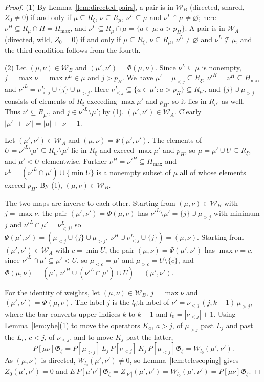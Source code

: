 \documentclass[11pt]{article}
\newcommand{\G}{\mathfrak{G}}
\begin{document}
\begin{proof}
(1) By Lemma~\ref{lem:directed-pairs}, a pair is in $\mathcal W_B$
(directed, shared, $Z_0\neq0$) if and only if $\mu\subseteq R_\xi$,
$\nu\subseteq R_\mu$, $\nu^L\subseteq\mu$ and $\nu^L\cap\mu\neq\varnothing$;
here $\nu^H\subseteq R_\mu\cap H=H_{\max}$, and
$\nu^L\subseteq R_\mu\cap\mu=\{a\in\mu:a>p_H\}$. A pair is in
$\mathcal W_A$ (directed, wild, $Z_0=0$) if and only if
$\mu\subseteq R_\xi$, $\nu\subseteq R_\mu$, $\nu^L\neq\varnothing$ and
$\nu^L\not\subseteq\mu$, and the third condition follows from the
fourth.

(2) Let $(\mu,\nu)\in\mathcal W_B$ and $(\mu',\nu')=\Phi(\mu,\nu)$.
Since $\nu^L\subseteq\mu$ is nonempty, $j=\max\nu=\max\nu^L\in\mu$ and
$j>p_H$. We have $\mu'=\mu_{<j}\subseteq R_\xi$, $\nu'^H=\nu^H\subseteq H_{\max}$
and $\nu'^L=\nu^L_{<j}\cup\{j\}\cup\mu_{>j}$. Here
$\nu^L_{<j}\subseteq\{a\in\mu':a>p_H\}\subseteq R_{\mu'}$, and
$\{j\}\cup\mu_{>j}$ consists of elements of $R_\xi$ exceeding
$\max\mu'$ and $p_H$, so it lies in $R_{\mu'}$ as well. Thus
$\nu'\subseteq R_{\mu'}$, and $j\in\nu'^L\setminus\mu'$; by (1),
$(\mu',\nu')\in\mathcal W_A$. Clearly $|\mu'|+|\nu'|=|\mu|+|\nu|-1$.

Let $(\mu',\nu')\in\mathcal W_A$ and $(\mu,\nu)=\Psi(\mu',\nu')$. The
elements of $U=\nu'^L\setminus\mu'\subseteq R_{\mu'}\setminus\mu'$ lie
in $R_\xi$ and exceed $\max\mu'$ and $p_H$, so $\mu=\mu'\cup U\subseteq R_\xi$,
and $\mu'<U$ elementwise. Further $\nu^H=\nu'^H\subseteq H_{\max}$ and
$\nu^L=(\nu'^L\cap\mu')\cup\{\min U\}$ is a nonempty subset of $\mu$
all of whose elements exceed $p_H$. By (1), $(\mu,\nu)\in\mathcal W_B$.

The two maps are inverse to each other. Starting from
$(\mu,\nu)\in\mathcal W_B$ with $j=\max\nu$, the pair
$(\mu',\nu')=\Phi(\mu,\nu)$ has $\nu'^L\setminus\mu'=\{j\}\cup\mu_{>j}$
with minimum $j$ and $\nu'^L\cap\mu'=\nu^L_{<j}$, so
$\Psi(\mu',\nu')=(\mu_{<j}\cup\{j\}\cup\mu_{>j},\ \nu^H\cup\nu^L_{<j}\cup\{j\})=(\mu,\nu)$.
Starting from $(\mu',\nu')\in\mathcal W_A$ with $c=\min U$, the pair
$(\mu,\nu)=\Psi(\mu',\nu')$ has $\max\nu=c$, since $\nu'^L\cap\mu'\subseteq\mu'<U$,
so $\mu_{<c}=\mu'$ and $\mu_{>c}=U\setminus\{c\}$, and
$\Phi(\mu,\nu)=(\mu',\ \nu'^H\cup(\nu'^L\cap\mu')\cup U)=(\mu',\nu')$.

For the identity of weights, let $(\mu,\nu)\in\mathcal W_B$,
$j=\max\nu$ and $(\mu',\nu')=\Phi(\mu,\nu)$. The label $j$ is the
$l_0$th label of $\nu'=\nu_{<j}\,(j,k-1)\,\overline{\mu_{>j}}$, where
the bar converts upper indices $k$ to $k-1$ and $l_0=|\nu_{<j}|+1$. Using
Lemma~\ref{lem:ybe}(1) to move the operators $K_a$, $a>j$, of
$\mu_{>j}$ past $L_j$ and past the $L_c$, $c<j$, of $\nu_{<j}$, and to
move $K_j$ past the latter,
\[
 P[\mu\nu]\G_\xi=P[\mu_{>j}]\,L_j\,P[\nu_{<j}]\,K_j\,P[\mu_{<j}]\G_\xi
 =W_{l_0}(\mu',\nu').
\]
As $(\mu,\nu)$ is directed, $W_{l_0}(\mu',\nu')\neq0$, so
Lemma~\ref{lem:telescoping} gives $Z_0(\mu',\nu')=0$ and
$E\,P[\mu'\nu']\G_\xi=Z_{|\nu'|}(\mu',\nu')=W_{l_0}(\mu',\nu')=P[\mu\nu]\G_\xi$.
\end{proof}
\end{document}
